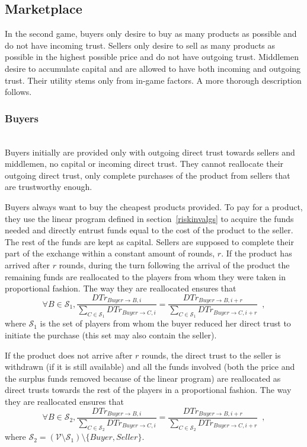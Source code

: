 \subsection{Marketplace}
  In the second game, buyers only desire to buy as many products as possible and do not have incoming trust. Sellers only
  desire to sell as many products as possible in the highest possible price and do not have outgoing trust. Middlemen desire
  to accumulate capital and are allowed to have both incoming and outgoing trust. Their utility stems only from in-game
  factors. A more thorough description follows.

  \subsubsection{Buyers} \ \\

    Buyers initially are provided only with outgoing direct trust towards sellers and middlemen, no capital or incoming direct
    trust. They cannot reallocate their outgoing direct trust, only complete purchases of the product from sellers that are
    trustworthy enough.
    
    Buyers always want to buy the cheapest products provided. To pay for a product, they use the linear program defined in
    section~\ref{riskinvalgs} to acquire the funds needed and directly entrust funds equal to the cost of the product to the
    seller. The rest of the funds are kept as capital. Sellers are supposed to complete their part of the exchange within a
    constant amount of rounds, $r$. If the product has arrived after $r$ rounds, during the turn following the arrival of the
    product the remaining funds are reallocated to the players from whom they were taken in proportional fashion. The way they
    are reallocated ensures that
    \begin{equation*}
      \forall B \in \mathcal{S}_1, \frac{DTr_{Buyer \rightarrow B, i}}{\sum\limits_{C \in \mathcal{S}_1}DTr_{Buyer \rightarrow
      C, i}} = \frac{DTr_{Buyer \rightarrow B, i + r}}{\sum\limits_{C \in \mathcal{S}_1}DTr_{Buyer \rightarrow C, i + r}}
      \enspace,
    \end{equation*}
    where $\mathcal{S}_1$ is the set of players from whom the buyer reduced her direct trust to initiate the purchase (this
    set may also contain the seller).

    If the product does not arrive after $r$ rounds, the direct trust to the seller is withdrawn (if it is still available)
    and all the funds involved (both the price and the surplus funds removed because of the linear program) are reallocated as
    direct trusts towards the rest of the players in a proportional fashion. The way they are reallocated ensures that
    \begin{equation*}
      \forall B \in \mathcal{S}_2, \frac{DTr_{Buyer \rightarrow B, i}}{\sum\limits_{C \in \mathcal{S}_2}DTr_{Buyer \rightarrow
      C, i}} = \frac{DTr_{Buyer \rightarrow B, i + r}}{\sum\limits_{C \in \mathcal{S}_2}DTr_{Buyer \rightarrow C, i + r}}
      \enspace,
    \end{equation*}
    where $\mathcal{S}_2 = \left(\mathcal{V} \setminus \mathcal{S}_1\right) \setminus{\{Buyer, Seller\}}$.

